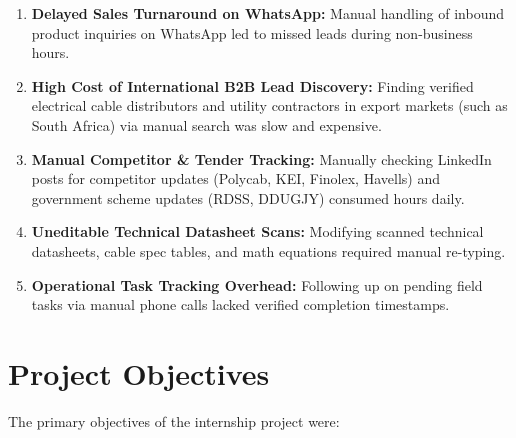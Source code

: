 \documentclass[12pt,a4paper]{report}
\begin{document}
\begin{enumerate}[leftmargin=*,itemsep=4pt]
    \item \textbf{Delayed Sales Turnaround on WhatsApp:} Manual handling of inbound product inquiries on WhatsApp led to missed leads during non-business hours.

    \item \textbf{High Cost of International B2B Lead Discovery:} Finding verified electrical cable distributors and utility contractors in export markets (such as South Africa) via manual search was slow and expensive.

    \item \textbf{Manual Competitor & Tender Tracking:} Manually checking LinkedIn posts for competitor updates (Polycab, KEI, Finolex, Havells) and government scheme updates (RDSS, DDUGJY) consumed hours daily.

    \item \textbf{Uneditable Technical Datasheet Scans:} Modifying scanned technical datasheets, cable spec tables, and math equations required manual re-typing.

    \item \textbf{Operational Task Tracking Overhead:} Following up on pending field tasks via manual phone calls lacked verified completion timestamps.
\end{enumerate}

\section{Project Objectives}

The primary objectives of the internship project were:
\end{document}
